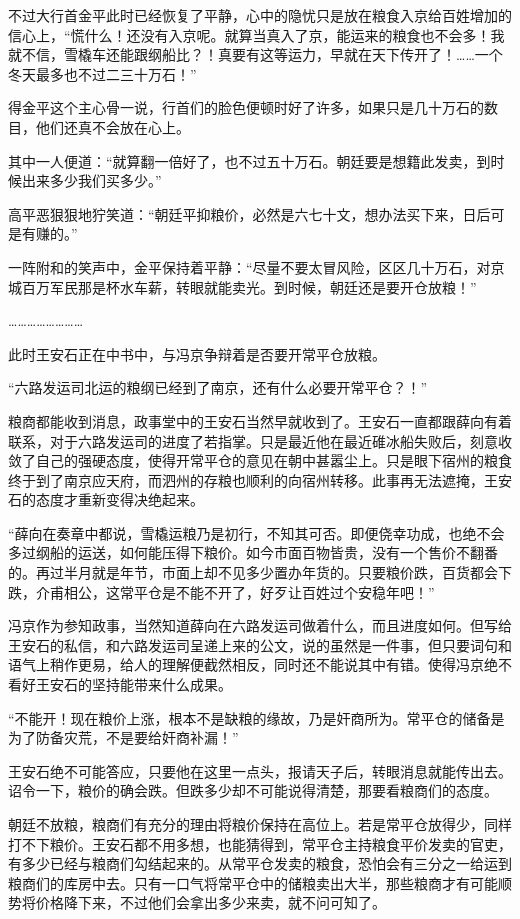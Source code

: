 不过大行首金平此时已经恢复了平静，心中的隐忧只是放在粮食入京给百姓增加的信心上，“慌什么！还没有入京呢。就算当真入了京，能运来的粮食也不会多！我就不信，雪橇车还能跟纲船比？！真要有这等运力，早就在天下传开了！……一个冬天最多也不过二三十万石！”

得金平这个主心骨一说，行首们的脸色便顿时好了许多，如果只是几十万石的数目，他们还真不会放在心上。

其中一人便道：“就算翻一倍好了，也不过五十万石。朝廷要是想籍此发卖，到时候出来多少我们买多少。”

高平恶狠狠地狞笑道：“朝廷平抑粮价，必然是六七十文，想办法买下来，日后可是有赚的。”

一阵附和的笑声中，金平保持着平静：“尽量不要太冒风险，区区几十万石，对京城百万军民那是杯水车薪，转眼就能卖光。到时候，朝廷还是要开仓放粮！”

……………………

此时王安石正在中书中，与冯京争辩着是否要开常平仓放粮。

“六路发运司北运的粮纲已经到了南京，还有什么必要开常平仓？！”

粮商都能收到消息，政事堂中的王安石当然早就收到了。王安石一直都跟薛向有着联系，对于六路发运司的进度了若指掌。只是最近他在最近碓冰船失败后，刻意收敛了自己的强硬态度，使得开常平仓的意见在朝中甚嚣尘上。只是眼下宿州的粮食终于到了南京应天府，而泗州的存粮也顺利的向宿州转移。此事再无法遮掩，王安石的态度才重新变得决绝起来。

“薛向在奏章中都说，雪橇运粮乃是初行，不知其可否。即便侥幸功成，也绝不会多过纲船的运送，如何能压得下粮价。如今市面百物皆贵，没有一个售价不翻番的。再过半月就是年节，市面上却不见多少置办年货的。只要粮价跌，百货都会下跌，介甫相公，这常平仓是不能不开了，好歹让百姓过个安稳年吧！”

冯京作为参知政事，当然知道薛向在六路发运司做着什么，而且进度如何。但写给王安石的私信，和六路发运司呈递上来的公文，说的虽然是一件事，但只要词句和语气上稍作更易，给人的理解便截然相反，同时还不能说其中有错。使得冯京绝不看好王安石的坚持能带来什么成果。

“不能开！现在粮价上涨，根本不是缺粮的缘故，乃是奸商所为。常平仓的储备是为了防备灾荒，不是要给奸商补漏！”

王安石绝不可能答应，只要他在这里一点头，报请天子后，转眼消息就能传出去。诏令一下，粮价的确会跌。但跌多少却不可能说得清楚，那要看粮商们的态度。

朝廷不放粮，粮商们有充分的理由将粮价保持在高位上。若是常平仓放得少，同样打不下粮价。王安石都不用多想，也能猜得到，常平仓主持粮食平价发卖的官吏，有多少已经与粮商们勾结起来的。从常平仓发卖的粮食，恐怕会有三分之一给运到粮商们的库房中去。只有一口气将常平仓中的储粮卖出大半，那些粮商才有可能顺势将价格降下来，不过他们会拿出多少来卖，就不问可知了。

